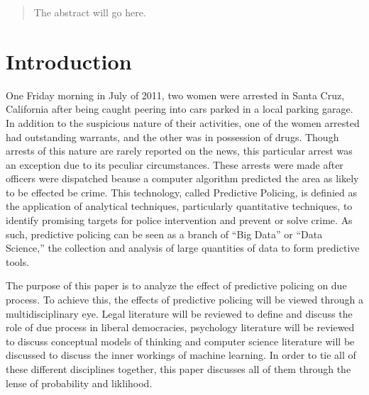 \documentclass[12pt]{article} %
\begin{document}
\clearpage\thispagestyle{empty}\addtocounter{page}{-1}
\tableofcontents %
\newpage %


\begin{abstract}
The abstract will go here.
\end{abstract}
\newpage
\section{Introduction}\label{sec:introduction} %

One Friday morning in July of 2011, two women were arrested in Santa Cruz, California after being caught peering into cars parked in a local parking garage. In addition to the suspicious nature of their activities, one of the women arrested had outstanding warrants, and the other was in possession of drugs. Though arrests of this nature are rarely reported on the news, this particular arrest was an exception due to its peculiar circumstances. These arrests were made after officers were dispatched beause a computer algorithm predicted the area as likely to be effected be crime. \cite{nyt} 
This technology, called Predictive Policing, is definied as the application of analytical techniques, particularly quantitative techniques, to identify promising targets for police intervention and prevent or solve crime. \cite{perryetal} As such, predictive policing can be seen as a branch of ``Big Data'' or ``Data Science,'' the collection and analysis of large quantities of data to form predictive tools.

The purpose of this paper is to analyze the effect of predictive policing on due process. To achieve this, the effects of predictive policing will be viewed through a multidisciplinary eye. Legal literature will be reviewed to define and discuss the role of due process in liberal democracies, psychology literature will be reviewed to discuss conceptual models of thinking and computer science literature will be discussed to discuss the inner workings of machine learning. In order to tie all of these different disciplines together, this paper discusses all of them through the lense of probability and liklihood.
\end{document}
